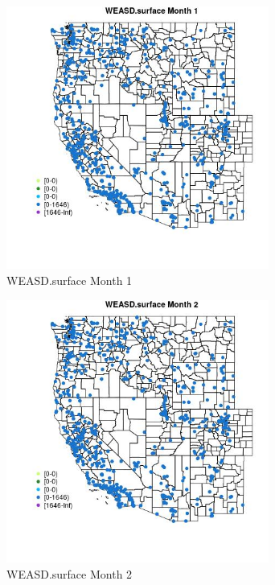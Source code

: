 \begin{figure} 
\centering  
\includegraphics[width=0.77\textwidth]{Code_Outputs/Report_ML_input_PM25_Step4_part_f_de_duplicated_aves_prioritize_24hr_obswNAs_MapObsMo1WEASDsurface.jpg} 
\caption{\label{fig:Report_ML_input_PM25_Step4_part_f_de_duplicated_aves_prioritize_24hr_obswNAsMapObsMo1WEASDsurface}WEASD.surface Month 1} 
\end{figure} 
 

\begin{figure} 
\centering  
\includegraphics[width=0.77\textwidth]{Code_Outputs/Report_ML_input_PM25_Step4_part_f_de_duplicated_aves_prioritize_24hr_obswNAs_MapObsMo2WEASDsurface.jpg} 
\caption{\label{fig:Report_ML_input_PM25_Step4_part_f_de_duplicated_aves_prioritize_24hr_obswNAsMapObsMo2WEASDsurface}WEASD.surface Month 2} 
\end{figure} 
 

